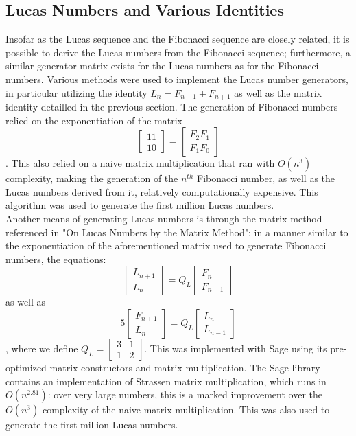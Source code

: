 \documentclass[11pt]{article}
\begin{document}
\subsection{Lucas Numbers and Various Identities}
Insofar as the Lucas sequence and the Fibonacci sequence are closely related, it is possible to derive the Lucas numbers from the Fibonacci sequence; furthermore, a similar generator matrix exists for the Lucas numbers as for the Fibonacci numbers. Various methods were used to implement the Lucas number generators, in particular utilizing the identity $L_{n} = F_{n-1} + F_{n+1}$ as well as the matrix identity detailled in the previous section. The generation of Fibonacci numbers relied on the exponentiation of the matrix \[
\begin{bmatrix}
1 1\\
1 0
\end{bmatrix} =  \begin{bmatrix} 
	F_{2} F_{1} \\
	F_{1} F_{0}
	
\end{bmatrix}
\] . This also relied on a naive matrix multiplication that ran with $O(n^{3})$ complexity, making the generation of the $n^{th}$ Fibonacci number, as well as the Lucas numbers derived from it, relatively  computationally expensive. This algorithm was used to generate the first million Lucas numbers.\\
Another means of generating Lucas numbers is through the matrix method referenced in "On Lucas Numbers by the Matrix Method": in a manner similar to the exponentiation of the aforementioned matrix used to generate Fibonacci numbers, the equations:
\[
\begin{bmatrix}
L_{n+1} \\
L_{n}
\end{bmatrix} = Q_{L} \begin{bmatrix} F_{n} \\ F_{n-1}\end{bmatrix}
\] 
as well as \\
\[
5\begin{bmatrix}
F_{n+1} \\
L_{n}
\end{bmatrix} = Q_{L} \begin{bmatrix} L_{n} \\ L_{n-1}\end{bmatrix}
\] , where we define $Q_{L} = \begin{bmatrix} 3 & 1 \\ 1 & 2 \end{bmatrix}$. This was implemented with Sage using its pre-optimized matrix constructors and matrix multiplication. The Sage library contains an implementation of Strassen matrix multiplication, which runs in $O(n^{2.81})$: over very large numbers, this is a marked improvement over the $O(n^{3})$ complexity of the naive matrix multiplication. This was also used to generate the first million Lucas numbers.
\end{document}
